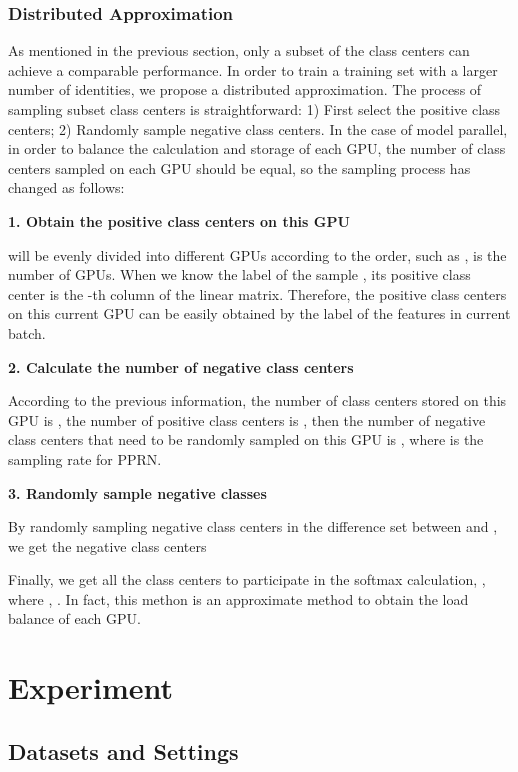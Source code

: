 \documentclass[letterpaper]{article} \usepackage{style/aaai21}  \usepackage{times}  \usepackage{helvet} \usepackage{courier}  \usepackage[hyphens]{url}  \usepackage{graphicx} \usepackage{color}
\begin{document}
\subsubsection{Distributed Approximation}
As mentioned in the previous section, only a subset of the class centers can achieve a comparable performance. In order to train a training set with a larger number of identities, we propose a distributed approximation. The process of sampling subset class centers is  straightforward: 1) First select the positive class centers; 2) Randomly sample negative class centers. In the case of model parallel, in order to balance the calculation and storage of each GPU, the number of class centers sampled on each GPU should be equal, so the sampling process has changed as follows: 

\noindent \textbf{1. Obtain the positive class centers on this GPU}  

 will be evenly divided into different GPUs according to the order, such as ,  is the number of GPUs. When we know the label  of the sample , its positive class center is the -th column of the  linear matrix. Therefore, the positive class centers  on this current GPU can be easily obtained by the label  of the features in current batch.

\noindent \textbf{2. Calculate the number of negative class centers} 
  
According to the previous information, the number of class centers stored on this GPU is , the number of positive class centers is , then the number of negative class centers that need to be randomly sampled on this GPU is , where  is the sampling rate for PPRN.

\noindent \textbf{3. Randomly sample negative classes}  

By randomly sampling  negative class centers in the difference set between  and , we get the negative class centers  

Finally, we get all the class centers to participate in the softmax calculation, , where , . In fact, this methon is an approximate method to obtain the load balance of each GPU.

\begin{small} 

\end{small}


\section{Experiment}
\subsection{Datasets and Settings}
\end{document}
